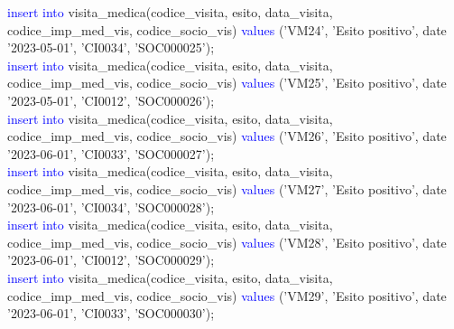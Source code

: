 \documentclass{article}
\begin{document}
\begin{flushleft}
{        \vspace{2mm}
        \hspace*{0.5em}\textcolor{blue}{insert into} visita\_medica(codice\_visita, esito, data\_visita, codice\_imp\_med\_vis, \hspace*{0.5em}codice\_socio\_vis) \textcolor{blue}{values} ('VM24', 'Esito positivo', date '2023-05-01', 'CI0034', \hspace*{0.5em}'SOC000025'); \\
        \vspace{2mm}
        \hspace*{0.5em}\textcolor{blue}{insert into} visita\_medica(codice\_visita, esito, data\_visita, codice\_imp\_med\_vis, \hspace*{0.5em}codice\_socio\_vis) \textcolor{blue}{values} ('VM25', 'Esito positivo', date '2023-05-01', 'CI0012', \hspace*{0.5em}'SOC000026'); \\
        \vspace{2mm}
        \hspace*{0.5em}\textcolor{blue}{insert into} visita\_medica(codice\_visita, esito, data\_visita, codice\_imp\_med\_vis, \hspace*{0.5em}codice\_socio\_vis) \textcolor{blue}{values} ('VM26', 'Esito positivo', date '2023-06-01', 'CI0033', \hspace*{0.5em}'SOC000027'); \\
        \vspace{2mm}
        \hspace*{0.5em}\textcolor{blue}{insert into} visita\_medica(codice\_visita, esito, data\_visita, codice\_imp\_med\_vis, \hspace*{0.5em}codice\_socio\_vis) \textcolor{blue}{values} ('VM27', 'Esito positivo', date '2023-06-01', 'CI0034', \hspace*{0.5em}'SOC000028'); \\
        \vspace{2mm}
        \hspace*{0.5em}\textcolor{blue}{insert into} visita\_medica(codice\_visita, esito, data\_visita, codice\_imp\_med\_vis, \hspace*{0.5em}codice\_socio\_vis) \textcolor{blue}{values} ('VM28', 'Esito positivo', date '2023-06-01', 'CI0012', \hspace*{0.5em}'SOC000029'); \\
        \vspace{2mm}
        \hspace*{0.5em}\textcolor{blue}{insert into} visita\_medica(codice\_visita, esito, data\_visita, codice\_imp\_med\_vis, \hspace*{0.5em}codice\_socio\_vis) \textcolor{blue}{values} ('VM29', 'Esito positivo', date '2023-06-01', 'CI0033', \hspace*{0.5em}'SOC000030'); \\
}
\end{flushleft}
\end{document}
